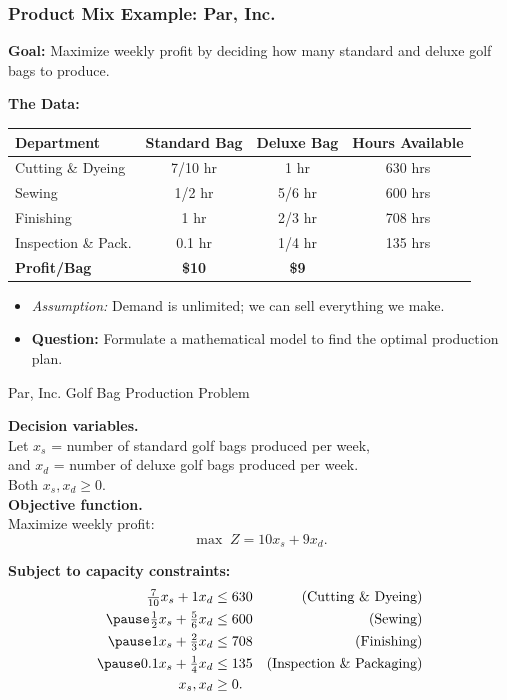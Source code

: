 \documentclass{beamer}
\begin{document}
\begin{frame}
\frametitle{Product Mix Example: Par, Inc.}
\textbf{Goal:} Maximize weekly profit by deciding how many standard and deluxe golf bags to produce.

\vspace{0.3cm}
\textbf{The Data:}
\begin{center}
\renewcommand{\arraystretch}{1.2}
\begin{tabular}{|l|c|c|c|}
\hline
\textbf{Department} & \textbf{Standard Bag} & \textbf{Deluxe Bag} & \textbf{Hours Available} \\
\hline
Cutting \& Dyeing & 7/10 hr & 1 hr & 630 hrs \\
Sewing & 1/2 hr & 5/6 hr & 600 hrs \\
Finishing & 1 hr & 2/3 hr & 708 hrs \\
Inspection \& Pack. & 0.1 hr & 1/4 hr & 135 hrs \\
\hline
\textbf{Profit/Bag} & \textbf{\$10} & \textbf{\$9} & \\
\hline
\end{tabular}
\end{center}

\vspace{0.3cm}
\begin{itemize}
    \item \textit{Assumption:} Demand is unlimited; we can sell everything we make.
    \item \textbf{Question:} Formulate a mathematical model to find the optimal production plan.
\end{itemize}
\end{frame}


\begin{frame}[shrink]{Par, Inc. Golf Bag Production Problem}

\textbf{Decision variables.} \\
Let \(x_s\) = number of standard golf bags produced per week,\\
and \(x_d\) = number of deluxe golf bags produced per week.\\[1ex]
Both \(x_s, x_d \ge 0.\)
\pause\\
\bigskip
\textbf{Objective function.} \\
Maximize weekly profit:
\[
\max \; Z = 10x_s + 9x_d.
\]

\textbf{Subject to capacity constraints:}
\[
\begin{aligned}
\tfrac{7}{10}x_s + 1x_d &\le 630 &\text{(Cutting \& Dyeing)}\\\pause
\tfrac{1}{2}x_s + \tfrac{5}{6}x_d &\le 600 &\text{(Sewing)}\\\pause
1x_s + \tfrac{2}{3}x_d &\le 708 &\text{(Finishing)}\\\pause
0.1x_s + \tfrac{1}{4}x_d &\le 135 &\text{(Inspection \& Packaging)}\\
x_s, x_d &\ge 0.
\end{aligned}
\]
\end{frame}
\end{document}
